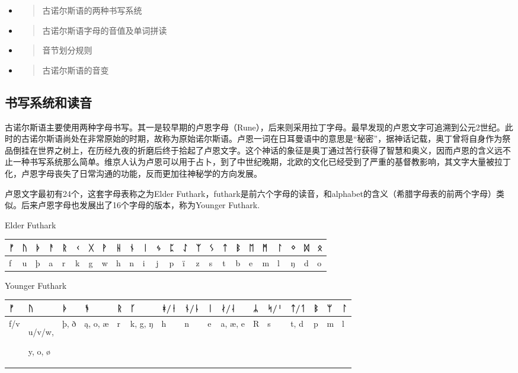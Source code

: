 \begin{itemize}
\item
  \begin{quote}
  古诺尔斯语的两种书写系统
  \end{quote}
\item
  \begin{quote}
  古诺尔斯语字母的音值及单词拼读
  \end{quote}
\item
  \begin{quote}
  音节划分规则
  \end{quote}
\item
  \begin{quote}
  古诺尔斯语的音变
  \end{quote}
\end{itemize}

\subsection{书写系统和读音}\label{ux4e66ux5199ux7cfbux7edfux548cux8bfbux97f3}

古诺尔斯语主要使用两种字母书写。其一是较早期的卢恩字母（Rune），后来则采用拉丁字母。最早发现的卢恩文字可追溯到公元2世纪。此时的古诺尔斯语尚处在非常原始的时期，故称为原始诺尔斯语。卢恩一词在日耳曼语中的意思是``秘密''，据神话记载，奥丁曾将自身作为祭品倒挂在世界之树上，在历经九夜的折磨后终于拾起了卢恩文字。这个神话的象征是奥丁通过苦行获得了智慧和奥义，因而卢恩的含义远不止一种书写系统那么简单。维京人认为卢恩可以用于占卜，到了中世纪晚期，北欧的文化已经受到了严重的基督教影响，其文字大量被拉丁化，卢恩字母丧失了日常沟通的功能，反而更加往神秘学的方向发展。

卢恩文字最初有24个，这套字母表称之为Elder
Futhark，futhark是前六个字母的读音，和alphabet的含义（希腊字母表的前两个字母）类似。后来卢恩字母也发展出了16个字母的版本，称为Younger
Futhark.

Elder Futhark

\begin{longtable}{llllllllllllllllllllllll}
\toprule
ᚠ & ᚢ & ᚦ & ᚨ & ᚱ & ᚲ & ᚷ & ᚹ & ᚺ & ᚾ & ᛁ & ᛃ & ᛈ & ᛇ & ᛉ & ᛊ & ᛏ & ᛒ & ᛖ & ᛗ & ᛚ & ᛜ & ᛞ & ᛟ \\
\midrule
\endhead
\bottomrule
\endfoot
f & u & þ & a & r & k & g & w & h & n & i & j & p & ï & z & s & t & b &
e & m & l & ŋ & d & o \\
\end{longtable}

Younger Futhark

\begin{longtable}{llllllllllllllll}
\toprule
ᚠ & ᚢ & ᚦ & ᚬ & ᚱ & ᚴ & ᚼ/ᚽ & ᚾ/ᚿ & ᛁ & ᛅ/ᛆ & ᛦ & ᛋ/ᛌ & ᛏ/ᛐ & ᛒ & ᛘ & ᛚ \\
\midrule
\endhead
\bottomrule
\endfoot
f/v & u/v/w,

y, o, ø & þ, ð & ą, o, æ & r & k, g, ŋ & h & n & e & a, æ, e & R & s &
t, d & p & m & l \\
\end{longtable}

